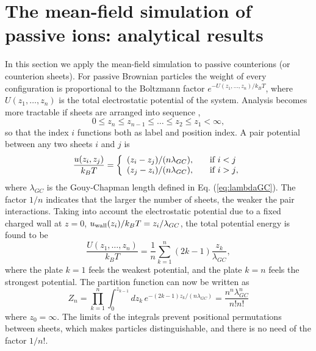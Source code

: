 \documentclass[pre,twocolumn,graphicx]{revtex4-1}
\newcommand{\be}{\begin{equation}}
\newcommand{\ee}{\end{equation}}
\begin{document}
\section{The mean-field simulation of passive ions: 
analytical results}
\label{sec:anal}


In this section we apply the mean-field simulation to passive counterions (or counterion sheets).  
For passive Brownian particles the weight of every configuration is proportional to the 
Boltzmann factor $e^{- U(z_1,\dots,z_n)/k_BT}$, where $U(z_1,\dots,z_n)$ is the total electrostatic 
potential of the system.  Analysis becomes more tractable if sheets are arranged into sequence 
\cite{Lenard61,Lenard62},  
\be
0\le z_n\le z_{n-1}\le \dots \le z_2\le  z_1<\infty, 
\ee
so that the index $i$ functions both as label and position index.  
A pair potential between any two sheets $i$ and $j$ is 
\be
\frac{u(z_i,z_j)}{k_BT} = \left\{ 
  \begin{array}{r l}
    (z_i-z_j)/(n\lambda_{GC}), & \quad \text{if $i<j$}\\
     (z_j-z_i)/(n\lambda_{GC}), & \quad \text{if $i>j$},
             \label{eq:uij}
  \end{array} 
  \right.
  \ee
where 
$\lambda_{GC}$ is the Gouy-Chapman length defined in Eq. (\ref{eq:lambdaGC}). The factor $1/n$ 
indicates that the larger the number of sheets, the weaker the pair interactions.  
Taking into account the electrostatic potential due to a fixed charged wall at $z=0$, 
$u_{\rm wall}(z_i)/k_BT = z_i/\lambda_{GC}$, the total potential energy is found to be 
\be
\frac{U(z_1,\dots,z_n)}{k_BT} =  \frac{1}{n} \sum_{k=1}^n(2k-1) \frac{z_k}{\lambda_{GC}},
\label{eq:U}
\ee
where the plate $k=1$ feels the weakest potential, and the plate $k=n$ feels the 
strongest potential.  The partition function can now be written as 
\be
Z_n= 
\prod_{k=1}^{n} \int_0^{z_{k-1}} \!\!\!\!\! dz_k\, e^{-(2k-1) z_k/(n\lambda_{GC})} 
= \frac{n^n\lambda_{GC}^n}{n!n!}
\label{eq:ZN}
\ee
where $z_0=\infty$.   The limits of the integrals prevent positional permutations between sheets, which makes
particles distinguishable, and there is no need of the factor $1/n!$.  
\end{document}
